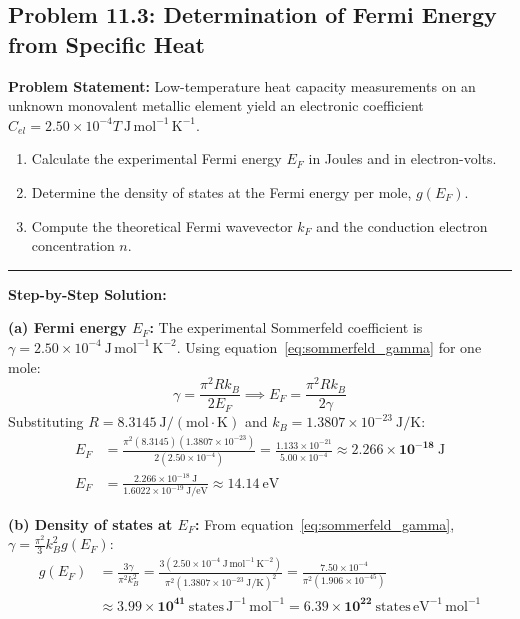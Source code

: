 \documentclass[11pt,a4paper]{article}
\begin{document}
\vspace{0.4cm}

\subsection{Problem 11.3: Determination of Fermi Energy from Specific Heat}
\textbf{Problem Statement:}
Low-temperature heat capacity measurements on an unknown monovalent metallic element yield an electronic coefficient $C_{el} = 2.50 \times 10^{-4} T\ \mathrm{J\,mol^{-1}\,K^{-1}}$.
\begin{enumerate}[label=(\alph*)]
    \item Calculate the experimental Fermi energy $E_F$ in Joules and in electron-volts.
    \item Determine the density of states at the Fermi energy per mole, $g(E_F)$.
    \item Compute the theoretical Fermi wavevector $k_F$ and the conduction electron concentration $n$.
\end{enumerate}

\vspace{0.2cm}\hrule\vspace{0.2cm}
\textbf{Step-by-Step Solution:}

\textbf{(a) Fermi energy $E_F$:}
The experimental Sommerfeld coefficient is $\gamma = 2.50 \times 10^{-4}\ \mathrm{J\,mol^{-1}\,K^{-2}}$.
Using equation~\eqref{eq:sommerfeld_gamma} for one mole:
\[
\gamma = \frac{\pi^2 R k_B}{2 E_F} \implies E_F = \frac{\pi^2 R k_B}{2\gamma}
\]
Substituting $R = 8.3145\ \mathrm{J/(mol\cdot K)}$ and $k_B = 1.3807 \times 10^{-23}\ \mathrm{J/K}$:
\begin{align*}
E_F &= \frac{\pi^2 (8.3145)(1.3807 \times 10^{-23})}{2(2.50 \times 10^{-4})} = \frac{1.133 \times 10^{-21}}{5.00 \times 10^{-4}} \approx \mathbf{2.266 \times 10^{-18}\ \mathrm{J}} \\
E_F &= \frac{2.266 \times 10^{-18}\ \mathrm{J}}{1.6022 \times 10^{-19}\ \mathrm{J/eV}} \approx \mathbf{14.14\ \mathrm{eV}}
\end{align*}

\textbf{(b) Density of states at $E_F$:}
From equation~\eqref{eq:sommerfeld_gamma}, $\gamma = \frac{\pi^2}{3}k_B^2 g(E_F)$:
\begin{align*}
g(E_F) &= \frac{3\gamma}{\pi^2 k_B^2} = \frac{3(2.50 \times 10^{-4}\ \mathrm{J\,mol^{-1}\,K^{-2}})}{\pi^2 (1.3807 \times 10^{-23}\ \mathrm{J/K})^2} = \frac{7.50 \times 10^{-4}}{\pi^2 (1.906 \times 10^{-45})} \\
&\approx \mathbf{3.99 \times 10^{41}\ \mathrm{states\,J^{-1}\,mol^{-1}}} = \mathbf{6.39 \times 10^{22}\ \mathrm{states\,eV^{-1}\,mol^{-1}}}
\end{align*}
\end{document}
